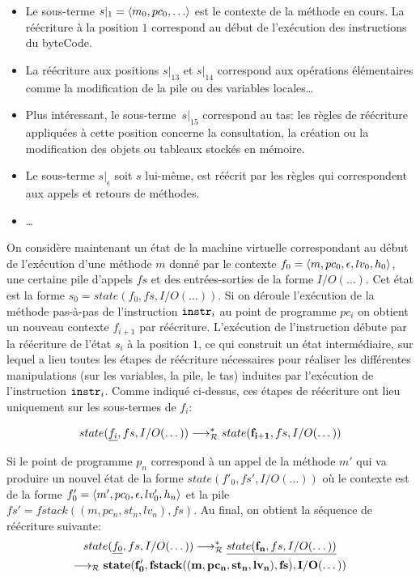 \begin{itemize}
\item Le sous-terme $s|_1 = \la m_0, pc_0, \dots \ra$ est le contexte
  de la méthode en cours. La réécriture à la position $1$ correspond au début de
  l'exécution des instructions du byteCode.

\item La réécriture aux positions $s|_{13}$ et $s|_{14}$ correspond
  aux opérations élémentaires comme la modification de la pile ou des
  variables locales\dots
  
\item Plus intéressant, le sous-terme~$s|_{15}$ correspond au tas: les
  règles de réécriture appliquées à cette position concerne la
  consultation, la création ou la modification des objets ou tableaux
  stockés en mémoire.

\item Le sous-terme $s|_\epsilon$ soit $s$ lui-même, est réécrit par les
  règles qui correspondent aux appels et retours de méthodes.
\item \dots
\end{itemize}

On considère maintenant un état de la machine virtuelle correspondant
au début de l'exécution d'une méthode $m$ donné par le contexte $f_0 =
\langle m, pc_0, \epsilon, lv_0, h_0\rangle$, une certaine pile d'appels $fs$
et des entrées-sorties de la forme $I/O(\dots)$.  Cet état est la
forme $s_0 = state(f_0, fs, I/O(\dots))$. Si on déroule l'exécution de
la méthode pas-à-pas de l'instruction $\mathtt{instr}_i$ au point de
programme $pc_i$ on obtient un nouveau contexte $f_{i+1}$ par
réécriture. L'exécution de l'instruction débute par la réécriture de
l'état $s_i$ à la position $1$, ce qui construit un état intermédiaire, sur
lequel a lieu toutes les étapes de réécriture nécessaires pour
réaliser les différentes manipulations (sur les variables, la pile, le
tas) induites par l'exécution de l'instruction $\mathtt{instr}_i$. Comme
indiqué ci-dessus, ces étapes de réécriture ont lieu uniquement sur
les sous-termes de $f_i$: %

\[ state(\underline{f_i}, fs, I/O(\dots)) \longrightarrow_\mathcal R^* state(\mathbf{f_{i+1}}, fs, I/O(\dots)) \]

Si le point de programme $p_n$ correspond à un appel de la méthode
$m'$ qui va produire un nouvel état de la forme $state(f'_0, fs',
I/O(\dots))$ où le contexte est de la forme $f'_0 = \langle m', pc_0,
\epsilon, lv'_0, h_n \rangle$ et la pile $fs' = fstack((m, pc_n, st_n,
lv_n), fs)$. Au final, on obtient la séquence de réécriture suivante:
\begin{multline*}
  state(\underline{f_0}, fs, I/O(\dots)) \longrightarrow_\mathcal R^* \underline{state(\mathbf{f_n}, fs, I/O(\dots))} \\
  \longrightarrow_\mathcal R \mathbf{state(f'_0, fstack((m, pc_n, st_n, lv_n), fs), I/O(\dots))}  
\end{multline*}

